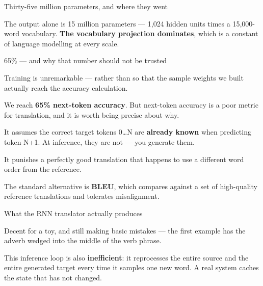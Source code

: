 \documentclass[aspectratio=169,11pt,t]{beamer}
\begin{document}
\begin{frame}[shrink=25]{Thirty-five million parameters, and where they went}
{\fontsize{9.4}{12.6}\selectfont\color{fg2}The output  alone is 15 million parameters --- 1,024 hidden units times a 15,000-word vocabulary. \textbf{The vocabulary projection dominates}, which is a constant of language modelling at every scale.\par}\vskip 4pt
\end{frame}

\begin{frame}[shrink=25]{65\% --- and why that number should not be trusted}
{\fontsize{9.4}{12.6}\selectfont\color{fg2}Training is unremarkable ---  rather than  so that the sample weights we built actually reach the accuracy calculation.\par}\vskip 4pt
{\fontsize{9.4}{12.6}\selectfont\color{fg2}We reach \textbf{65\% next-token accuracy}. But next-token accuracy is a poor metric for translation, and it is worth being precise about why.\par}\vskip 4pt
\begin{ibullets}
\item It assumes the correct target tokens 0\ldots{}N are \textbf{already known} when predicting token N+1. At inference, they are not --- you generate them.
\item It punishes a perfectly good translation that happens to use a different word order from the reference.
\item The standard alternative is \textbf{BLEU}, which compares against a set of high-quality reference translations and tolerates misalignment.
\end{ibullets}
\end{frame}

\begin{frame}[shrink=25]{What the RNN translator actually produces}
{\fontsize{9.4}{12.6}\selectfont\color{fg2}Decent for a toy, and still making basic mistakes --- the first example has the adverb wedged into the middle of the verb phrase.\par}\vskip 4pt
\begin{iband}[amber]
This inference loop is also \textbf{inefficient}: it reprocesses the entire source and the entire generated target every time it samples one new word. A real system caches the state that has not changed.
\end{iband}
\end{frame}
\end{document}
